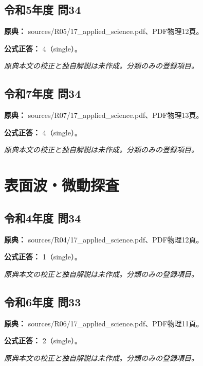 \subsection{令和5年度 問34}
\label{q:r05-reg-applied-34}

\noindent\textbf{原典：} sources/R05/17\_applied\_science.pdf、PDF物理12頁。

\textbf{公式正答：} 4（single）。

\par\textit{原典本文の校正と独自解説は未作成。分類のみの登録項目。}

\subsection{令和7年度 問34}
\label{q:r07-reg-applied-34}

\noindent\textbf{原典：} sources/R07/17\_applied\_science.pdf、PDF物理13頁。

\textbf{公式正答：} 4（single）。

\par\textit{原典本文の校正と独自解説は未作成。分類のみの登録項目。}

\section{表面波・微動探査}

\subsection{令和4年度 問34}
\label{q:r04-reg-applied-34}

\noindent\textbf{原典：} sources/R04/17\_applied\_science.pdf、PDF物理12頁。

\textbf{公式正答：} 1（single）。

\par\textit{原典本文の校正と独自解説は未作成。分類のみの登録項目。}

\subsection{令和6年度 問33}
\label{q:r06-reg-applied-33}

\noindent\textbf{原典：} sources/R06/17\_applied\_science.pdf、PDF物理11頁。

\textbf{公式正答：} 2（single）。

\par\textit{原典本文の校正と独自解説は未作成。分類のみの登録項目。}


